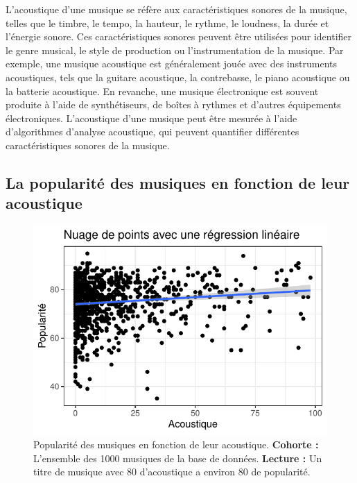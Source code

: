 \documentclass[french,]{compterendu}
\theoremstyle{urcastyle}
\theoremstyle{remark}
\begin{document}
L'acoustique d'une musique se réfère aux caractéristiques sonores de la musique, telles que le timbre, le tempo, la hauteur, le rythme, le loudness, la durée et l'énergie sonore. Ces caractéristiques sonores peuvent être utilisées pour identifier le genre musical, le style de production ou l'instrumentation de la musique. Par exemple, une musique acoustique est généralement jouée avec des instruments acoustiques, tels que la guitare acoustique, la contrebasse, le piano acoustique ou la batterie acoustique. En revanche, une musique électronique est souvent produite à l'aide de synthétiseurs, de boîtes à rythmes et d'autres équipements électroniques. L'acoustique d'une musique peut être mesurée à l'aide d'algorithmes d'analyse acoustique, qui peuvent quantifier différentes caractéristiques sonores de la musique.

\hypertarget{la-popularituxe9-des-musiques-en-fonction-de-leur-acoustique}{%
\subsection{La popularité des musiques en fonction de leur acoustique}\label{la-popularituxe9-des-musiques-en-fonction-de-leur-acoustique}}





\begin{figure}[ht!]

{\centering \includegraphics{ERTAS_ELIF-CR_SEP0831_files/figure-latex/popacous-1} 

}

\caption{Popularité des musiques en fonction de leur acoustique.
\textbf{Cohorte :} L'ensemble des 1000 musiques de la base de données.
\textbf{Lecture :} Un titre de musique avec 80 d'acoustique a environ 80 de popularité.}\label{fig:popacous}
\end{figure}
\end{document}
